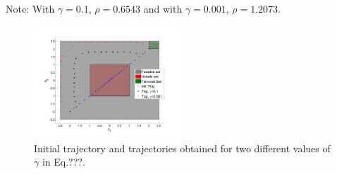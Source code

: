 
Note: With $\gamma=0.1$, $\rho=0.6543$ and with $\gamma=0.001$, $\rho=1.2073$.

\begin{figure}[t]
\centering
\includegraphics[width=0.49\textwidth]{figures/ToyExampleControl}
\caption{Initial trajectory and trajectories obtained for two different values of $\gamma$ in Eq.???.}
\label{fig:toy control}
\end{figure}